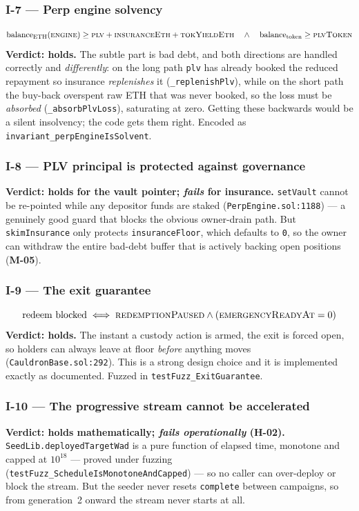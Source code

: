 \documentclass[10pt,a4paper]{article}
\newcommand{\code}[1]{\texttt{\small #1}}
\begin{document}
\subsubsection*{I-7 --- Perp engine solvency}
\[
\mathrm{balance}_{\mathrm{ETH}}(\textsc{engine}) \ge \textsc{plv} + \textsc{insuranceEth} + \textsc{tokYieldEth}
\quad\wedge\quad
\mathrm{balance}_{\mathrm{token}} \ge \textsc{plvToken}
\]
\textbf{Verdict: holds.} The subtle part is bad debt, and both directions are
handled correctly and \emph{differently}: on the long path \code{plv} has
already booked the reduced repayment so insurance \emph{replenishes} it
(\code{\_replenishPlv}), while on the short path the buy-back overspent raw ETH
that was never booked, so the loss must be \emph{absorbed}
(\code{\_absorbPlvLoss}), saturating at zero. Getting these backwards would be a
silent insolvency; the code gets them right. Encoded as
\code{invariant\_perpEngineIsSolvent}.

\subsubsection*{I-8 --- PLV principal is protected against governance}
\textbf{Verdict: holds for the vault pointer; \emph{fails} for insurance.}
\code{setVault} cannot be re-pointed while any depositor funds are staked
(\code{PerpEngine.sol:1188}) --- a genuinely good guard that blocks the obvious
owner-drain path. But \code{skimInsurance} only protects \code{insuranceFloor},
which defaults to \code{0}, so the owner can withdraw the entire bad-debt buffer
that is actively backing open positions (\textbf{M-05}).

\subsubsection*{I-9 --- The exit guarantee}
\[
\text{redeem blocked} \iff \textsc{redemptionPaused} \wedge (\textsc{emergencyReadyAt} = 0)
\]
\textbf{Verdict: holds.} The instant a custody action is armed, the exit is
forced open, so holders can always leave at floor \emph{before} anything moves
(\code{CauldronBase.sol:292}). This is a strong design choice and it is
implemented exactly as documented. Fuzzed in
\code{testFuzz\_ExitGuarantee}.

\subsubsection*{I-10 --- The progressive stream cannot be accelerated}
\textbf{Verdict: holds mathematically; \emph{fails operationally}
(\textbf{H-02}).} \code{SeedLib.deployedTargetWad} is a pure function of elapsed
time, monotone and capped at $10^{18}$ --- proved under fuzzing
(\code{testFuzz\_ScheduleIsMonotoneAndCapped}) --- so no caller can over-deploy
or block the stream. But the seeder never resets \code{complete} between
campaigns, so from generation~2 onward the stream never starts at all.
\end{document}
